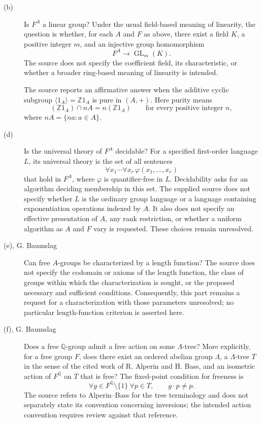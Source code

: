 \documentclass[11pt]{article}
\begin{document}
\begin{description}
\item[(b)] Is \(F^A\) a linear group? Under the usual field-based meaning of linearity, the question is whether, for each \(A\) and \(F\) as above, there exist a field \(K\), a positive integer \(m\), and an injective group homomorphism
\[
F^A\longrightarrow \operatorname{GL}_m(K).
\]
The source does not specify the coefficient field, its characteristic, or whether a broader ring-based meaning of linearity is intended.

The source reports an affirmative answer when the additive cyclic subgroup \(\langle 1_A\rangle=\mathbb Z1_A\) is pure in \((A,+)\). Here purity means
\[
(\mathbb Z1_A)\cap nA=n(\mathbb Z1_A)
\qquad\text{for every positive integer }n,
\]
where \(nA=\{na:a\in A\}\).

\item[(d)] Is the universal theory of \(F^A\) decidable? For a specified first-order language \(L\), its universal theory is the set of all sentences
\[
\forall x_1\cdots\forall x_r\,\varphi(x_1,\ldots,x_r)
\]
that hold in \(F^A\), where \(\varphi\) is quantifier-free in \(L\). Decidability asks for an algorithm deciding membership in this set. The supplied source does not specify whether \(L\) is the ordinary group language or a language containing exponentiation operations indexed by \(A\). It also does not specify an effective presentation of \(A\), any rank restriction, or whether a uniform algorithm as \(A\) and \(F\) vary is requested. These choices remain unresolved.

\item[(e), G. Baumslag] Can free \(A\)-groups be characterized by a length function? The source does not specify the codomain or axioms of the length function, the class of groups within which the characterization is sought, or the proposed necessary and sufficient conditions. Consequently, this part remains a request for a characterization with those parameters unresolved; no particular length-function criterion is asserted here.

\item[(f), G. Baumslag] Does a free \(\mathbb Q\)-group admit a free action on some \(\Lambda\)-tree? More explicitly, for a free group \(F\), does there exist an ordered abelian group \(\Lambda\), a \(\Lambda\)-tree \(T\) in the sense of the cited work of R. Alperin and H. Bass, and an isometric action of \(F^{\mathbb Q}\) on \(T\) that is free? The fixed-point condition for freeness is
\[
\forall g\in F^{\mathbb Q}\setminus\{1\}\ \forall p\in T,
\qquad g\cdot p\ne p.
\]
The source refers to Alperin--Bass for the tree terminology and does not separately state its convention concerning inversions; the intended action convention requires review against that reference.


\end{description}
\end{document}
